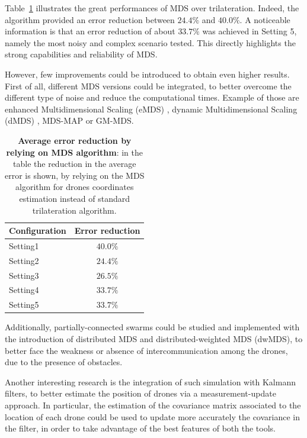 
Table~\ref{tab:error_reduction} illustrates the great performances of MDS over trilateration. Indeed, the algorithm provided an error reduction between $24.4\%$ and $40.0\%$. A noticeable information is that an error reduction of about $33.7\%$ was achieved in Setting 5, namely the most noisy and complex scenario tested. This directly highlights the strong capabilities and reliability of MDS. \par           

However, few improvements could be introduced to obtain even higher results. First of all, different MDS versions could be integrated, to better overcome the different type of noise and reduce the computational times. Example of those are enhanced Multidimensional Scaling (eMDS) \cite{eMDS}, dynamic Multidimensional Scaling (dMDS) \cite{dMDS}, MDS-MAP or GM-MDS. \par

\begin{table}[!ht]
  \centering
    \begin{tabular}{l|c}
      \textbf{Configuration} & \textbf{Error reduction} \\\hline
      Setting1 & $40.0\%$ \\\hline
      Setting2 & $24.4\%$ \\\hline
      Setting3 & $26.5\%$ \\\hline
      Setting4 & $33.7\%$ \\\hline
      Setting5 & $33.7\%$ \\\hline
    \end{tabular}
    \caption[Average error reduction by relying on MDS algorithm]{
        \textbf{Average error reduction by relying on MDS algorithm}: in the table the reduction in the average error is shown, by relying on the MDS algorithm for drones coordinates estimation instead of standard trilateration algorithm.  
    }
    \label{tab:error_reduction}
\end{table}

Additionally, partially-connected swarms could be studied and implemented with the introduction of distributed MDS and distributed-weighted MDS (dwMDS), to better face the weakness or absence of intercommunication among the drones, due to the presence of obstacles. \par

Another interesting research is the integration of such simulation with Kalmann filters, to better estimate the position of drones via a measurement-update approach. In particular, the estimation of the covariance matrix associated to the location of each drone could be used to update more accurately the covariance in the filter, in order to take advantage of the best features of both the tools.